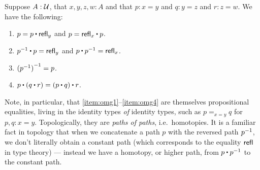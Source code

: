 \begin{lem}\label{thm:omg}%
  Suppose $A:\mathcal{U}$, that $x,y,z,w:A$ and that $p:x= y$ and $q:y = z$ and $r:z=w$.
  We have the following:
  \begin{enumerate}
  \item $p= p\ct \refl{y}$ and $p = \refl{x} \ct p$.\label{item:omg1}
  \item $\opp{p}\ct p=  \refl{y}$ and $p\ct \opp{p}= \refl{x}$.
  \item $\mathord{{(\mathord{{p}^{-1}})}^{-1}}= p$.
  \item $p\ct (q\ct r)=  (p\ct q)\ct r$.\label{item:omg4}
  \end{enumerate}
\end{lem}

Note, in particular, that \ref{item:omg1}--\ref{item:omg4} are themselves propositional equalities, living in the identity types \emph{of} identity types, such as $p=_{x=y}q$ for $p,q:x=y$.
Topologically, they are \emph{paths of paths}, i.e.\ homotopies.
It is a familiar fact in topology that when we concatenate a path $p$ with the reversed path $\mathord{{p}^{-1}}$, we don't literally obtain a constant path (which corresponds to the equality $\mathsf{refl}_{}$ in type theory) --- instead we have a homotopy, or higher path, from $p\ct\opp p$ to the constant path.

